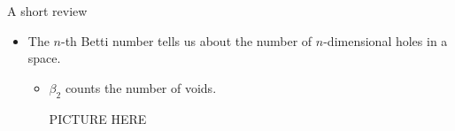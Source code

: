 \documentclass[handout]{beamer}
\begin{document}
\begin{frame}{A short review}
\begin{itemize}
\item The $n$-th Betti number tells us about the number of $n$-dimensional holes in a space.
	\begin{itemize}
	\item<2-> $\beta_2$ counts the number of voids.
	
	PICTURE HERE
	\end{itemize}
\end{itemize}
\end{frame}
\end{document}
